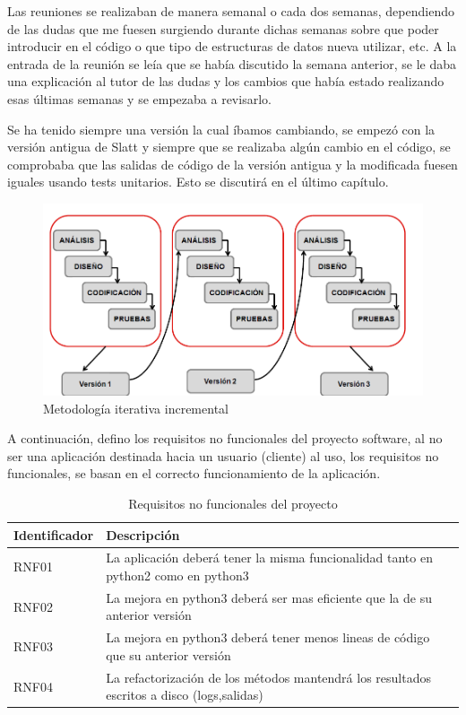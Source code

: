 \documentclass{cosas/tfg_domingo}
\begin{document}
Las reuniones se realizaban de manera semanal o cada dos semanas, dependiendo de las dudas que me fuesen surgiendo durante dichas semanas sobre que poder introducir en el código o que tipo de estructuras de datos nueva utilizar, etc. A la entrada de la reunión se leía que se había discutido la semana anterior, se le daba una explicación al tutor de las dudas y los cambios que había estado realizando esas últimas semanas y se empezaba a revisarlo.

Se ha tenido siempre una versión la cual íbamos cambiando, se empezó con la versión antigua de Slatt y siempre que se realizaba algún cambio en el código, se comprobaba que las salidas de código de la versión antigua y la modificada fuesen iguales usando tests unitarios. Esto se discutirá en el último capítulo. 



\begin{figure}[ht!] %
\begin{center}
\includegraphics[width=.7\linewidth]{imagenes/Metodologia.png}
\end{center}
\caption{Metodología iterativa incremental}
\label{fig_pro}
\end{figure}

A continuación, defino los requisitos no funcionales del proyecto software, al no ser una aplicación destinada hacia un usuario (cliente) al uso, los requisitos no funcionales, se basan en el correcto funcionamiento de la aplicación.

\begin{table}[h]
\centering
\begin{tabular}{|l|l|}
\hline
Identificador & Descripción                              \\ \hline
RNF01         & La aplicación deberá tener la misma funcionalidad tanto en python2 como en python3                                          \\ \hline
RNF02          & La mejora en python3 deberá ser mas eficiente que la de su anterior versión                                         \\ \hline
RNF03          & La mejora en python3 deberá tener menos lineas de código que su anterior versión                                         \\ \hline
RNF04          & La refactorización de los métodos mantendrá los resultados escritos a disco (logs,salidas)                          \\ \hline
\end{tabular}
\caption{Requisitos no funcionales del proyecto}
\label{tab:my-table}
\end{table}
\end{document}
